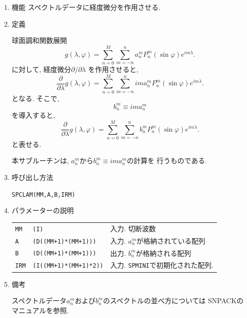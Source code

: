 \documentclass[a4j,fleqn]{jarticle}
\begin{document}
\begin{enumerate}

\item 機能 
スペクトルデータに経度微分を作用させる.

\item 定義

球面調和関数展開
\begin{equation}
g(\lambda,\varphi)=\sum^M_{n=0}\sum^n_{m=-n}
a^m_nP^m_n(\sin\varphi)e^{im\lambda}.
\end{equation}
に対して, 経度微分$\partial/\partial\lambda$
を作用させると, 
\begin{equation}
\frac{\partial}{\partial\lambda} g(\lambda,\varphi)
=\sum^M_{n=0}\sum^n_{m=-n}im a^m_nP^m_n(\sin\varphi)e^{im\lambda}.
\end{equation}
となる. そこで,
\begin{equation}
b^m_n\equiv im a^m_n
\end{equation}
を導入すると, 
\begin{equation}
\frac{\partial}{\partial\lambda} g(\lambda,\varphi)
=\sum^M_{n=0}\sum^n_{m=-n}b^m_nP^m_n(\sin\varphi)e^{im\lambda}.
\end{equation}
と表せる. 

本サブルーチンは,
$a^m_n$から$b^m_n\equiv im a^m_n$の計算を
行うものである. 

\item 呼び出し方法 
    
{\tt SPCLAM(MM,A,B,IRM)}
  
\item パラメーターの説明

\begin{tabular}{lll}
{\tt MM} & {\tt (I)} & 入力. 切断波数\\
{\tt A} & {\tt (D((MM+1)*(MM+1)))} & 入力. $a^m_n$が格納されている配列\\
{\tt B} & {\tt (D((MM+1)*(MM+1)))} & 出力. $b^m_n$が格納される配列\\
{\tt IRM} & {\tt (I((MM+1)*(MM+1)*2))} & 入力.
	{\tt SPMINI}で初期化された配列.
\end{tabular}

\item 備考

スペクトルデータ$a^m_n$および$b^m_n$のスペクトルの並べ方については
SNPACKのマニュアルを参照. 

\end{enumerate}

\end{document}
